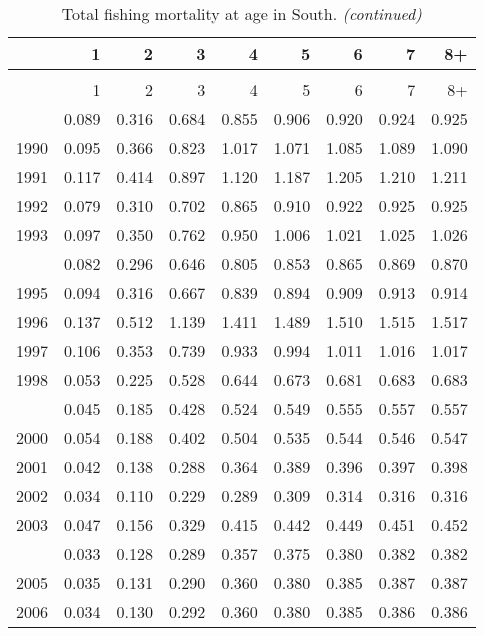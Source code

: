 \documentclass[
]{article}
\begin{document}
\begin{longtable}[t]{lrrrrrrrr}
\caption{\label{tab:South-region-FAA-table}Total fishing mortality at age in South.}\\
\toprule
  & 1 & 2 & 3 & 4 & 5 & 6 & 7 & 8+\\
\midrule
\endfirsthead
\caption[]{Total fishing mortality at age in South. \textit{(continued)}}\\
\toprule
  & 1 & 2 & 3 & 4 & 5 & 6 & 7 & 8+\\
\midrule
\endhead

\endfoot
\bottomrule
\endlastfoot
1989 & 0.089 & 0.316 & 0.684 & 0.855 & 0.906 & 0.920 & 0.924 & 0.925\\
1990 & 0.095 & 0.366 & 0.823 & 1.017 & 1.071 & 1.085 & 1.089 & 1.090\\
1991 & 0.117 & 0.414 & 0.897 & 1.120 & 1.187 & 1.205 & 1.210 & 1.211\\
1992 & 0.079 & 0.310 & 0.702 & 0.865 & 0.910 & 0.922 & 0.925 & 0.925\\
1993 & 0.097 & 0.350 & 0.762 & 0.950 & 1.006 & 1.021 & 1.025 & 1.026\\
\addlinespace
1994 & 0.082 & 0.296 & 0.646 & 0.805 & 0.853 & 0.865 & 0.869 & 0.870\\
1995 & 0.094 & 0.316 & 0.667 & 0.839 & 0.894 & 0.909 & 0.913 & 0.914\\
1996 & 0.137 & 0.512 & 1.139 & 1.411 & 1.489 & 1.510 & 1.515 & 1.517\\
1997 & 0.106 & 0.353 & 0.739 & 0.933 & 0.994 & 1.011 & 1.016 & 1.017\\
1998 & 0.053 & 0.225 & 0.528 & 0.644 & 0.673 & 0.681 & 0.683 & 0.683\\
\addlinespace
1999 & 0.045 & 0.185 & 0.428 & 0.524 & 0.549 & 0.555 & 0.557 & 0.557\\
2000 & 0.054 & 0.188 & 0.402 & 0.504 & 0.535 & 0.544 & 0.546 & 0.547\\
2001 & 0.042 & 0.138 & 0.288 & 0.364 & 0.389 & 0.396 & 0.397 & 0.398\\
2002 & 0.034 & 0.110 & 0.229 & 0.289 & 0.309 & 0.314 & 0.316 & 0.316\\
2003 & 0.047 & 0.156 & 0.329 & 0.415 & 0.442 & 0.449 & 0.451 & 0.452\\
\addlinespace
2004 & 0.033 & 0.128 & 0.289 & 0.357 & 0.375 & 0.380 & 0.382 & 0.382\\
2005 & 0.035 & 0.131 & 0.290 & 0.360 & 0.380 & 0.385 & 0.387 & 0.387\\
2006 & 0.034 & 0.130 & 0.292 & 0.360 & 0.380 & 0.385 & 0.386 & 0.386\\

\end{longtable}
\end{document}
